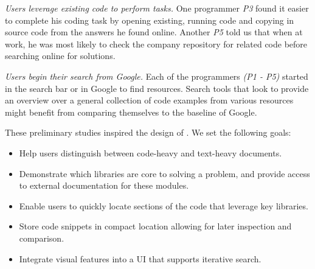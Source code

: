 \emph{Users leverage existing code to perform tasks.}
One programmer \emph{P3} found it easier to complete his coding task by opening existing, running code and copying in source code from the answers he found online.
Another \emph{P5} told us that when at work, he was most likely to check the company repository for related code before searching online for solutions.

\emph{Users begin their search from Google.}
Each of the programmers \emph{(P1 - P5)} started in the search bar or in Google to find resources.
Search tools that look to provide an overview over a general collection of code examples from various resources might benefit from comparing themselves to the baseline of Google.

These preliminary studies inspired the design of \systemname{}.
We set the following goals:

\begin{itemize}[noitemsep]
\item Help users distinguish between code-heavy and text-heavy documents.
\item Demonstrate which libraries are core to solving a problem, and provide access to external documentation for these modules.
\item Enable users to quickly locate sections of the code that leverage key libraries.
\item Store code snippets in compact location allowing for later inspection and comparison.
\item Integrate visual features into a UI that supports iterative search.
\end{itemize}